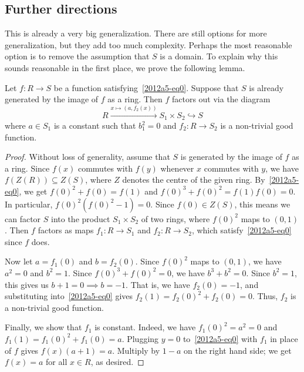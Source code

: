 \subsection*{Further directions}

This is already a very big generalization.
There are still options for more generalization, but they add too much complexity.
Perhaps the most reasonable option is to remove the assumption that $S$ is a domain.
To explain why this sounds reasonable in the first place, we prove the following lemma.

\begin{lemma}
Let $f : R \to S$ be a function satisfying~\eqref{2012a5-eq0}.
Suppose that $S$ is already generated by the image of $f$ as a ring.
Then $f$ factors out via the diagram
\[ R \xrightarrow{x \mapsto (a, f_2(x))} S_1 \times S_2 \hookrightarrow S \]
    where $a \in S_1$ is a constant such that $b_1^2 = 0$ and $f_2 : R \to S_2$ is a non-trivial good function.
\end{lemma}
\begin{proof}
Without loss of generality, assume that $S$ is generated by the image of $f$ as a ring.
Since $f(x)$ commutes with $f(y)$ whenever $x$ commutes with $y$, we have $f(Z(R)) \subseteq Z(S)$, where $Z$ denotes the centre of the given ring.
By~\eqref{2012a5-eq0}, we get $f(0)^2 + f(0) = f(1)$ and $f(0)^3 + f(0)^2 = f(1) f(0) = 0$.
In particular, $f(0)^2 (f(0)^2 - 1) = 0$.
Since $f(0) \in Z(S)$, this means we can factor $S$ into the product $S_1 \times S_2$ of two rings, where $f(0)^2$ maps to $(0, 1)$.
Then $f$ factors as maps $f_1 : R \to S_1$ and $f_2 : R \to S_2$, which satisfy~\eqref{2012a5-eq0} since $f$ does.

Now let $a = f_1(0)$ and $b = f_2(0)$.
Since $f(0)^2$ maps to $(0, 1)$, we have $a^2 = 0$ and $b^2 = 1$.
Since $f(0)^3 + f(0)^2 = 0$, we have $b^3 + b^2 = 0$.
Since $b^2 = 1$, this gives us $b + 1 = 0 \implies b = -1$.
That is, we have $f_2(0) = -1$, and substituting into~\eqref{2012a5-eq0} gives $f_2(1) = f_2(0)^2 + f_2(0) = 0$.
Thus, $f_2$ is a non-trivial good function.

Finally, we show that $f_1$ is constant.
Indeed, we have $f_1(0)^2 = a^2 = 0$ and $f_1(1) = f_1(0)^2 + f_1(0) = a$.
Plugging $y = 0$ to~\eqref{2012a5-eq0} with $f_1$ in place of $f$ gives $f(x) (a + 1) = a$.
Multiply by $1 - a$ on the right hand side; we get $f(x) = a$ for all $x \in R$, as desired.
\end{proof}
